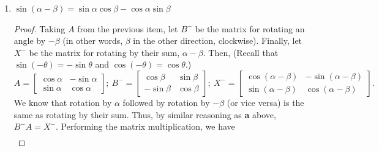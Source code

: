\documentclass{article}
\begin{document}
\begin{enumerate}
\begin{enumerate}
\begin{proof}
\begin{align*}
\begin{bmatrix}
                    \cos\alpha\sin\beta + \sin\alpha\cos\beta& -\sin\alpha\sin\beta + \cos\alpha\cos\beta
                \end{bmatrix}.
            \end{align*} Setting this to be equal to \(X\) and rearranging some terms,\[
                \begin{bmatrix}
                    \cos\alpha\cos\beta - \sin\alpha\sin\beta&-\sin\alpha\cos\beta-\cos\alpha\sin\beta \\ 
                    \colorbox{Periwinkle!42}{\(\sin\alpha\cos\beta + \cos\alpha\sin\beta\)}& -\sin\alpha\sin\beta + \cos\alpha\cos\beta
                \end{bmatrix} = \begin{bmatrix}
                    \cos(\alpha + \beta)&-\sin(\alpha + \beta) \\ \colorbox{Periwinkle!42}{\(\sin(\alpha+\beta)\)}&\cos(\alpha + \beta)
                \end{bmatrix} 
            \] gives us \(\sin(\alpha + \beta) = \sin\alpha\cos\beta + \cos\alpha\sin\beta\), which proves the identity. 
        \end{proof}
        \item \(\sin(\alpha - \beta) = \sin\alpha\cos\beta - \cos\alpha\sin\beta\)\begin{proof}
            Taking \(A\) from the previous item, let \(B^-\) be the matrix for rotating an angle by \(-\beta\) (in other words, \(\beta\) in the other direction, clockwise). Finally, let \(X^-\) be the matrix for rotating by their sum, \(\alpha -\beta\). Then, 
            (Recall that \(\sin(-\theta) = -\sin\theta\) and \(\cos(-\theta) = \cos\theta\).)\[
                A = \begin{bmatrix}
                    \cos\alpha&-\sin\alpha \\ \sin\alpha&\cos\alpha
                \end{bmatrix};~B^- = \begin{bmatrix}
                    \cos\beta&\sin\beta \\ -\sin\beta&\cos\beta
                \end{bmatrix};~X^- =  \begin{bmatrix}
                    \cos(\alpha - \beta)&-\sin(\alpha - \beta) \\ \sin(\alpha-\beta)&\cos(\alpha - \beta)
                \end{bmatrix}.
            \] We know that rotation by \(\alpha\) followed by rotation by \(-\beta\) (or vice versa) is the same as rotating by their sum. Thus, by similar reasoning as \textbf{a} above, \(B^-A = X^-\). Performing the matrix multiplication, we have\begin{align*} 

\end{align*}
\end{proof}
\end{enumerate}
\end{enumerate}
\end{document}
